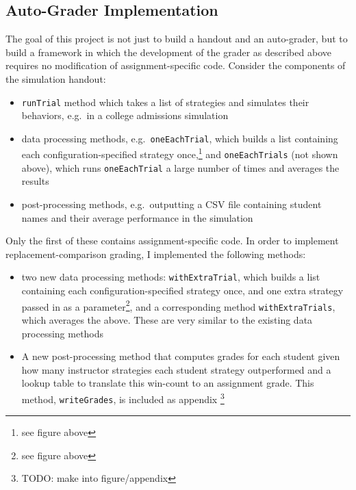 \documentclass[pageno]{jpaper}
\begin{document}
\subsection*{Auto-Grader Implementation}
The goal of this project is not just to build a handout and an auto-grader, but to build a framework in which the development of the grader as described above requires no modification of assignment-specific code.
Consider the components of the simulation handout:
\begin{itemize}
\item \texttt{runTrial} method which takes a list of strategies and simulates their behaviors, e.g.\ in a college admissions simulation
\item data processing methods, e.g.\ \texttt{oneEachTrial}, which builds a list containing each configuration-specified strategy once,\footnote{see figure above} and \texttt{oneEachTrials} (not shown above), which runs \texttt{oneEachTrial} a large number of times and averages the results
\item post-processing methods, e.g.\ outputting a CSV file containing student names and their average performance in the simulation
\end{itemize}
Only the first of these contains assignment-specific code.
In order to implement replacement-comparison grading, I implemented the following methods:
\begin{itemize}
\item two new data processing methods: \texttt{withExtraTrial}, which builds a list containing each configuration-specified strategy once, and one extra strategy passed in as a parameter\footnote{see figure above}, and a corresponding method \texttt{withExtraTrials}, which averages the above. These are very similar to the existing data processing methods
\item A new post-processing method that computes grades for each student given how many instructor strategies each student strategy outperformed and a lookup table to translate this win-count to an assignment grade. This method, \texttt{writeGrades}, is included as appendix \footnote{TODO: make into figure/appendix}
\end{itemize}
\end{document}
